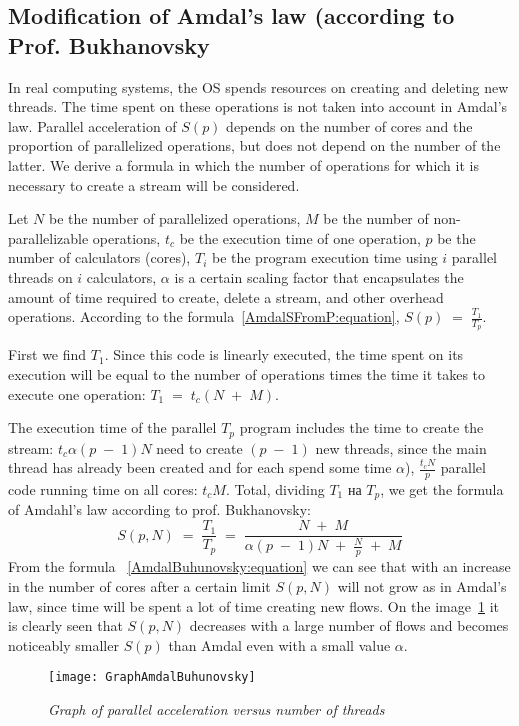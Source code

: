 { %
	\subsection{Modification of Amdal's law (according to Prof. Bukhanovsky}
	\par In real computing systems, the OS spends resources on creating and deleting new threads. The time spent on these operations is not taken into account in Amdal's law. Parallel acceleration of $ S (p) $ depends on the number of cores and the proportion of parallelized operations, but does not depend on the number of the latter. We derive a formula in which the number of operations for which it is necessary to create a stream will be considered.
	\par Let $N$ be the number of parallelized operations, $ M $ be the number of non-parallelizable operations,  $t_c$ be the execution time of one operation, $p$ be the number of calculators (cores), $T_i$ be the program execution time using $i$ parallel threads on $i$ calculators, $\alpha$ is a certain scaling factor that encapsulates the amount of time required to create, delete a stream, and other overhead operations.
According to the formula~\eqref{AmdalSFromP:equation}, $S(p)\;=\;\frac{T_1}{T_p}$.
	\par First we find $ T_1 $. Since this code is linearly executed, the time spent on its execution will be equal to the number of operations times the time it takes to execute one operation: $T_1\;=\;t_c(N\;+\;M)$. 
	\par The execution time of the parallel $T_p$ program includes the time to create the stream: $t_c\alpha(p\;-\;1)N$ need to create $(p\;-\;1)$ new threads, since the main thread has already been created and for each spend some time $\alpha$),  $\frac {t_cN}p$ parallel code running time on all cores: $t_cM$. Total, dividing $T_1$ на $T_p$, we get the formula of Amdahl’s law according to prof. Bukhanovsky:
	\begin{equation}
		\label{AmdalBuhunovsky:equation}
		S(p,N)\;=\;\frac{T_1}{T_p}\;=\;\frac{N\;+\;M}{\alpha(p\;-\;1)N\;+\;\frac Np\;+\;M}
	\end{equation}
From the formula ~\eqref{AmdalBuhunovsky:equation} we can see that with an increase in the number of cores after a certain limit $S(p,N)$ will not grow as in Amdal’s law, since time will be spent a lot of time creating new flows. On the image~\ref{GraphAmdalBuhunovsky:image} it is clearly seen that $S(p,N)$ decreases with a large number of flows and becomes noticeably smaller $S(p)$ than Amdal even with a small value $\alpha$.
	\begin{figure}[H]
		\texttt{[image: GraphAmdalBuhunovsky]}
		\caption{\textit{Graph of parallel acceleration versus number of threads}}
		\label{GraphAmdalBuhunovsky:image}
	\end{figure}
}